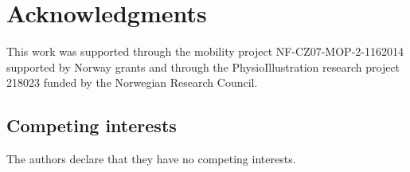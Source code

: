 \documentclass[twocolumn]{bmcart}%
\begin{document}
\section*{Acknowledgments}
This work was supported through the mobility project NF-CZ07-MOP-2-1162014 supported by Norway grants and through the PhysioIllustration research project 218023 funded by the Norwegian Research Council.

\begin{backmatter}


\section*{Competing interests}
The authors declare that they have no competing interests.





\end{backmatter}
\end{document}
